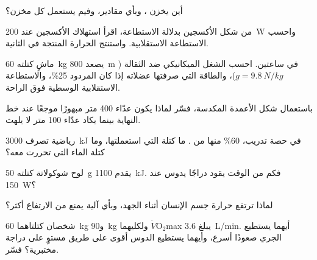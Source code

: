 \begin{exercise}[$\star$]\label{exo:g10:exercise-and-energy:5}
أين يخزن ، وبأي مقادير، وفيم يستعمل كل مخزن؟
\end{exercise}

\begin{exercise}[$\star\star$]\label{exo:g10:exercise-and-energy:6}
من شكل الأكسجين بدلالة الاستطاعة، اقرأ استهلاك الأكسجين عند
\qty{200}{W} واحسب الاستطاعة الاستقلابية. واستنتج الحرارة المنتجة في
الثانية.
\end{exercise}

\begin{exercise}[$\star\star$]\label{exo:g10:exercise-and-energy:7}
ماشٍ كتلته \qty{60}{kg} يصعد \qty{800}{m} في ساعتين. احسب الشغل
الميكانيكي ضد الثقالة ($g = \qty{9.8}{N/kg}$)، والطاقة التي صرفتها
عضلاته إذا كان المردود 25\%، والاستطاعة الاستقلابية الوسطية فوق
الراحة.
\end{exercise}

\begin{exercise}[$\star\star$]\label{exo:g10:exercise-and-energy:8}
باستعمال شكل الأعمدة المكدسة، فسّر لماذا يكون عدّاء 400 متر مبهورًا
موجعًا عند خط النهاية بينما يكاد عدّاء 100 متر لا يلهث.
\end{exercise}

\begin{exercise}[$\star\star$]\label{exo:g10:exercise-and-energy:9}
رياضية تصرف \qty{3000}{kJ} في حصة تدريب، 60\% منها من .
ما كتلة  التي استعملتها، وما كتلة الماء التي تحررت معه؟
\end{exercise}

\begin{exercise}[$\star\star$]\label{exo:g10:exercise-and-energy:10}
لوح شوكولاتة كتلته \qty{50}{g} يقدم \qty{1100}{kJ}. فكم من الوقت يقود
دراجًا يدوس عند \qty{150}{W}؟
\end{exercise}

\begin{exercise}[$\star\star$]\label{exo:g10:exercise-and-energy:11}
لماذا ترتفع حرارة جسم الإنسان أثناء الجهد، وبأي آلية يمنع من الارتفاع
أكثر؟
\end{exercise}

\begin{exercise}[$\star\star\star$]\label{exo:g10:exercise-and-energy:12}
شخصان كتلتاهما \qty{60}{kg} و\qty{90}{kg} ولكليهما
$\dot V\!\mathrm{O_2}$max يبلغ \qty{3.6}{L/min}. أيهما يستطيع الجري
صعودًا أسرع، وأيهما يستطيع الدوس أقوى على طريق مستوٍ على دراجة
مختبرية؟ فسّر.
\end{exercise}

